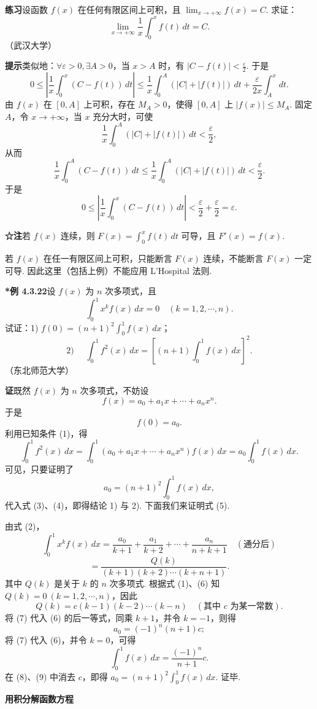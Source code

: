 \documentclass[UTF8,12pt,a4paper,fontset=fandol]{ctexart}
\begin{document}
\noindent\textbf{练习}\quad 设函数 $f(x)$ 在任何有限区间上可积，且 $\lim_{x\to+\infty}f(x)=C$. 求证：
\[
\lim_{x\to+\infty}\frac1x\int_0^x f(t)\,dt=C.
\]
（武汉大学）

\noindent\textbf{提示}\quad 类似地：$\forall\varepsilon>0,\exists A>0$，当 $x>A$ 时，有 $|C-f(t)|<\frac{\varepsilon}{2}$. 于是
\[
0\le\left|\frac1x\int_0^x(C-f(t))\,dt\right|
\le\frac1x\int_0^A(|C|+|f(t)|)\,dt+\frac{\varepsilon}{2x}\int_A^x dt.
\]
由 $f(x)$ 在 $[0,A]$ 上可积，存在 $M_A>0$，使得 $[0,A]$ 上 $|f(x)|\le M_A$. 固定 $A$，令 $x\to+\infty$，当 $x$ 充分大时，可使
\[
\frac1x\int_0^A(|C|+|f(t)|)\,dt<\frac{\varepsilon}{2},
\]
从而
\[
\frac1x\int_0^A(C-f(t))\,dt
\le\frac1x\int_0^A(|C|+|f(t)|)\,dt<\frac{\varepsilon}{2}.
\]
于是
\[
0\le\left|\frac1x\int_0^x(C-f(t))\,dt\right|
<\frac{\varepsilon}{2}+\frac{\varepsilon}{2}=\varepsilon.
\]

\noindent\textbf{☆注}\quad 若 $f(x)$ 连续，则 $F(x)=\int_0^x f(t)\,dt$ 可导，且 $F'(x)=f(x)$.

若 $f(x)$ 在任一有限区间上可积，只能断言 $F(x)$ 连续，不能断言 $F(x)$ 一定可导. 因此这里（包括上例）不能应用 L'Hospital 法则.

\noindent\textbf{*例 4.3.22}\quad 设 $f(x)$ 为 $n$ 次多项式，且
\[
\int_0^1 x^k f(x)\,dx=0\quad(k=1,2,\cdots,n).
\tag{1}
\]
试证：1) $f(0)=(n+1)^2\int_0^1 f(x)\,dx$；
\[
\text{2) }\quad
\int_0^1 f^2(x)\,dx
=\left[(n+1)\int_0^1 f(x)\,dx\right]^2.
\]
（东北师范大学）

\noindent\textbf{证}\quad 既然 $f(x)$ 为 $n$ 次多项式，不妨设
\[
f(x)=a_0+a_1x+\cdots+a_nx^n.
\tag{2}
\]
于是
\[
f(0)=a_0.
\tag{3}
\]
利用已知条件 (1)，得
\[
\int_0^1 f^2(x)\,dx
=\int_0^1(a_0+a_1x+\cdots+a_nx^n)f(x)\,dx
=a_0\int_0^1 f(x)\,dx.
\tag{4}
\]
可见，只要证明了
\[
a_0=(n+1)^2\int_0^1 f(x)\,dx,
\tag{5}
\]
代入式 (3)、(4)，即得结论 1) 与 2). 下面我们来证明式 (5).

由式 (2)，
\[
\int_0^1 x^k f(x)\,dx
=\frac{a_0}{k+1}+\frac{a_1}{k+2}+\cdots+\frac{a_n}{n+k+1}\quad(\text{通分后})
\]
\[
=\frac{Q(k)}{(k+1)(k+2)\cdots(k+n+1)}.
\tag{6}
\]
其中 $Q(k)$ 是关于 $k$ 的 $n$ 次多项式. 根据式 (1)、(6) 知 $Q(k)=0\ (k=1,2,\cdots,n)$，因此
\[
Q(k)=c(k-1)(k-2)\cdots(k-n)\quad(\text{其中 }c\text{ 为某一常数}).
\tag{7}
\]
将 (7) 代入 (6) 的后一等式，同乘 $k+1$，并令 $k=-1$，则得
\[
a_0=(-1)^n(n+1)c;
\tag{8}
\]
将 (7) 代入 (6)，并令 $k=0$，可得
\[
\int_0^1 f(x)\,dx=\frac{(-1)^n}{n+1}c.
\tag{9}
\]
在 (8)、(9) 中消去 $c$，即得 $a_0=(n+1)^2\int_0^1 f(x)\,dx$. 证毕.

\noindent\textbf{用积分解函数方程}
\end{document}
